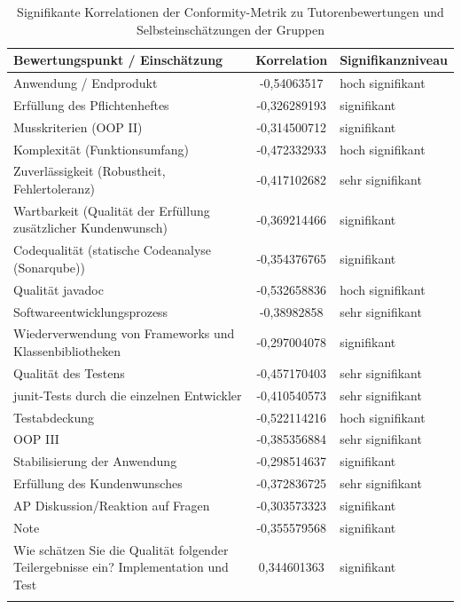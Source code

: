 \documentclass[da,ngerman]{stthesis}
\begin{document}
				\begin{center}
					\tabulinesep=1.5mm
					\begin{longtabu}{|p{0.5\textwidth}|c|p{0.25\textwidth}|}
						\hline
  						\textbf{Bewertungspunkt / Einschätzung} & \textbf{Korrelation} & \textbf{Signifikanzniveau}\\
  						\hline
    					Anwendung / Endprodukt & -0,54063517 & hoch signifikant \\
    					\hline
						Erfüllung des Pflichtenheftes & -0,326289193 & signifikant \\
						\hline
						Musskriterien (OOP II) & -0,314500712 & signifikant \\
						\hline
						Komplexität (Funktionsumfang) & -0,472332933 & hoch signifikant \\
						\hline
						Zuverlässigkeit (Robustheit, Fehlertoleranz) & -0,417102682 & sehr signifikant \\
						\hline
						Wartbarkeit (Qualität der Erfüllung zusätzlicher Kundenwunsch) & -0,369214466 & signifikant \\
						\hline
						Codequalität (statische Codeanalyse (Sonarqube)) & -0,354376765 & signifikant \\
						\hline
						Qualität javadoc & -0,532658836 & hoch signifikant \\
						\hline
						Softwareentwicklungsprozess & -0,38982858 & sehr signifikant \\
						\hline
						Wiederverwendung von Frameworks und Klassenbibliotheken & -0,297004078 & signifikant \\
						\hline
						Qualität des Testens & -0,457170403 & sehr signifikant \\
						\hline
						junit-Tests durch die einzelnen Entwickler & -0,410540573 & sehr signifikant \\
						\hline
						Testabdeckung & -0,522114216 & hoch signifikant \\
						\hline
						OOP III & -0,385356884 & sehr signifikant \\
						\hline
						Stabilisierung der Anwendung & -0,298514637 & signifikant \\
						\hline
						Erfüllung des Kundenwunsches & -0,372836725 & sehr signifikant \\
						\hline
						AP Diskussion/Reaktion auf Fragen & -0,303573323 & signifikant \\
						\hline
						Note & -0,355579568 & signifikant \\
						\hline
						 Wie schätzen Sie die Qualität folgender Teilergebnisse ein? Implementation und Test & 0,344601363 & signifikant \\
    					\hline
    					\caption{Signifikante Korrelationen der Conformity-Metrik zu Tutorenbewertungen und Selbsteinschätzungen der Gruppen}
						\label{conformitykorrel} \\
  					\end{longtabu}  
  				\end{center}
\end{document}

